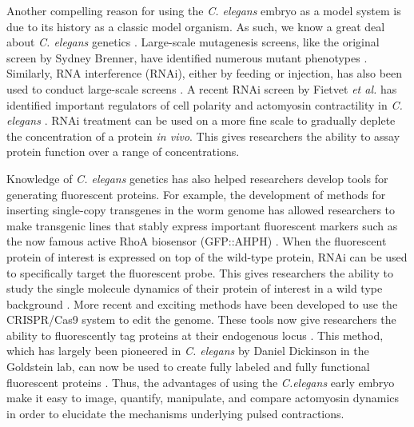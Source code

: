 \documentclass{ucetd}
\begin{document}
Another compelling reason for using the \textit{C. elegans} embryo as a model system is due to its history as a classic model organism.  As such, we know a great deal about \textit{C. elegans} genetics \cite{Jorgensen:2002ej}.  Large-scale mutagenesis screens, like the original screen by Sydney Brenner, have identified numerous mutant phenotypes \cite{Brenner:1974wn}.  Similarly, RNA interference (RNAi), either by feeding or injection, has also been used to conduct large-scale screens \cite{Timmons:2001wg, Kamath:2003bk}.  A recent RNAi  screen by Fietvet \textit{et al.} has identified important regulators of cell polarity and actomyosin contractility in \textit{C. elegans} \cite{Fievet:2013ho}.  RNAi treatment can be used on a more fine scale to gradually deplete the concentration of a protein \textit{in vivo}.  This gives researchers the ability to assay protein function over a range of concentrations. 


Knowledge of \textit{C. elegans} genetics has also helped researchers develop tools for generating fluorescent proteins.  For example, the development of methods for inserting single-copy transgenes in the worm genome has allowed researchers to make transgenic lines that stably express important fluorescent markers such as the now famous active RhoA biosensor (GFP::AHPH) \cite{FrokjaerJensen:2008kj, Tse:2012fp}.  When the fluorescent protein of interest is expressed on top of the wild-type protein, RNAi can be used to specifically target the fluorescent probe.  This gives researchers the ability to study the single molecule dynamics of their protein of interest in a wild type background \cite{Robin:2014jf}.  More recent and exciting methods have been developed to use the CRISPR/Cas9 system to edit the genome.  These tools now give researchers the ability to fluorescently tag proteins at their endogenous locus \cite{Hsu:2014ck}.  This method, which has largely been pioneered in \textit{C. elegans} by Daniel Dickinson in the Goldstein lab, can now be used to create fully labeled and fully functional fluorescent proteins \cite{Dickinson:2013ea, Dickinson:2016cv}.  Thus, the advantages of using the \textit{C.elegans} early embryo make it easy to image, quantify, manipulate, and compare actomyosin dynamics in order to elucidate the mechanisms underlying pulsed contractions.  
\end{document}
